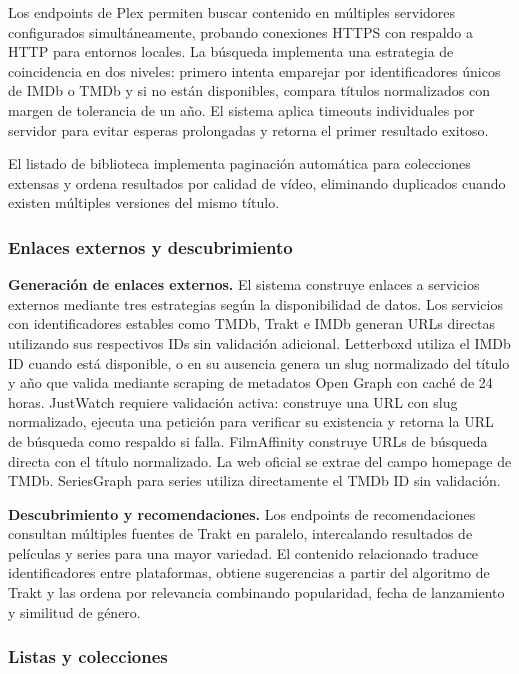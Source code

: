 Los endpoints de Plex permiten buscar contenido en múltiples servidores configurados simultáneamente, probando conexiones HTTPS con respaldo a HTTP para entornos locales. La búsqueda implementa una estrategia de coincidencia en dos niveles: primero intenta emparejar por identificadores únicos de IMDb o TMDb y si no están disponibles, compara títulos normalizados con margen de tolerancia de un año. El sistema aplica timeouts individuales por servidor para evitar esperas prolongadas y retorna el primer resultado exitoso.

El listado de biblioteca implementa paginación automática para colecciones extensas y ordena resultados por calidad de vídeo, eliminando duplicados cuando existen múltiples versiones del mismo título.

\subsubsection{Enlaces externos y descubrimiento}

\textbf{Generación de enlaces externos.} El sistema construye enlaces a servicios externos mediante tres estrategias según la disponibilidad de datos. Los servicios con identificadores estables como TMDb, Trakt e IMDb generan URLs directas utilizando sus respectivos IDs sin validación adicional. Letterboxd utiliza el IMDb ID cuando está disponible, o en su ausencia genera un slug normalizado del título y año que valida mediante scraping de metadatos Open Graph con caché de 24 horas. JustWatch requiere validación activa: construye una URL con slug normalizado, ejecuta una petición para verificar su existencia y retorna la URL de búsqueda como respaldo si falla. FilmAffinity construye URLs de búsqueda directa con el título normalizado. La web oficial se extrae del campo homepage de TMDb. SeriesGraph para series utiliza directamente el TMDb ID sin validación.

\textbf{Descubrimiento y recomendaciones.} Los endpoints de recomendaciones consultan múltiples fuentes de Trakt en paralelo, intercalando resultados de películas y series para una mayor variedad. El contenido relacionado traduce identificadores entre plataformas, obtiene sugerencias a partir del algoritmo de Trakt y las ordena por relevancia combinando popularidad, fecha de lanzamiento y similitud de género.

\subsubsection{Listas y colecciones}

